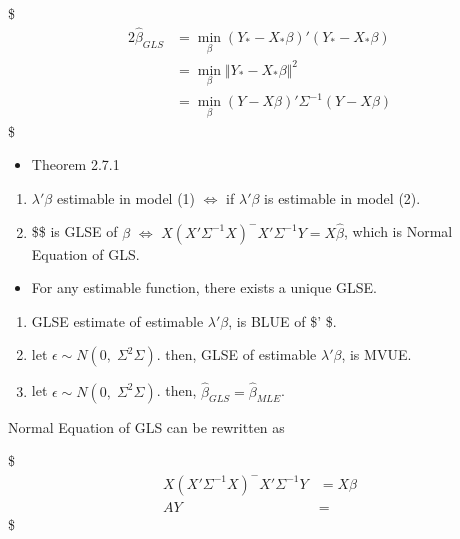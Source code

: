 \documentclass[
]{book}
\providecommand{\tightlist}{%
  \setlength{\itemsep}{0pt}\setlength{\parskip}{0pt}}
\begin{document}
{{{\$
\begin{alignat}{2}

\hat \beta_{GLS} &= \min_\beta (Y_\ast - X_\ast \beta)'(Y_\ast - X_\ast \beta) \\

&= \min_\beta \Vert Y_\ast - X_\ast \beta \Vert^2 \\



&= \min_\beta (Y - X \beta)' \Sigma^{-1} (Y - X \beta) \tag{Generalized LSE (GLSE) of β}


\end{alignat}
\$

\begin{itemize}
\tightlist
\item
  Theorem 2.7.1
\end{itemize}

\begin{enumerate}
\def\labelenumi{\arabic{enumi}.}
\tightlist
\item
  \(\lambda ' \beta\) estimable in model (1) \(\iff\) if \(\lambda ' \beta\) is estimable in model (2).
\item
  \$\hat \beta \$ is GLSE of \(\beta\) \(\iff\) \(X(X' \Sigma^{-1} X)^{-}X' \Sigma^{-1}Y = X \hat \beta\), which is Normal Equation of GLS.
\end{enumerate}

\begin{itemize}
\tightlist
\item
  For any estimable function, there exists a unique GLSE.
\end{itemize}

\begin{enumerate}
\def\labelenumi{\arabic{enumi}.}
\setcounter{enumi}{2}
\tightlist
\item
  GLSE estimate of estimable \(\lambda' \beta\), is BLUE of \$\lambda' \beta \$.
\item
  let \(\epsilon \sim N(0, \; \Sigma^2 \Sigma)\). then, GLSE of estimable \(\lambda ' \beta\), is MVUE.
\item
  let \(\epsilon \sim N(0, \; \Sigma^2 \Sigma)\). then, \(\hat \beta_{GLS} = \hat \beta_{MLE}\).
\end{enumerate}

Normal Equation of GLS can be rewritten as

\$
\begin{align}

X(X' \Sigma^{-1} X)^{-}X' \Sigma^{-1}Y &= X \hat \beta \\
AY &=
\end{align}
\$

}}}
\end{document}
